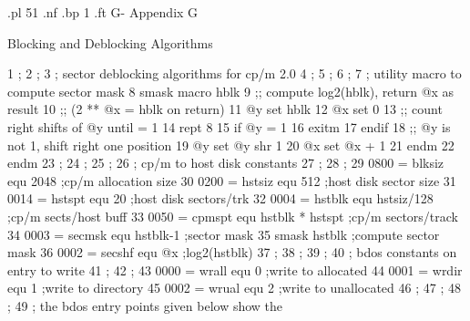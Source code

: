 .pl 51
.nf
.bp 1
.ft                                                       G-%
                                     Appendix G

                         Blocking and Deblocking Algorithms



  1                ;
  2                ;
  3                ;         sector deblocking algorithms for cp/m 2.0
  4                ;
  5                ;
  6                ;
  7                ;         utility macro to compute sector mask
  8                smask     macro    hblk
  9                ;;        compute log2(hblk), return @x as result
 10                ;;        (2 ** @x = hblk on return)
 11                @y        set      hblk
 12                @x        set      0
 13                ;;        count right shifts of @y until = 1
 14                          rept     8
 15                          if       @y = 1
 16                          exitm
 17                          endif
 18                ;;        @y is not 1, shift right one position
 19                @y        set      @y shr 1
 20                @x        set      @x + 1
 21                          endm
 22                          endm
 23                ;
 24                ;
 25                ;
 26                ;         cp/m to host disk constants
 27                ;
 28                ;
 29    0800 =      blksiz    equ      2048                   ;cp/m allocation size
 30    0200 =      hstsiz    equ      512                    ;host disk sector size
 31    0014 =      hstspt    equ      20                     ;host disk sectors/trk
 32    0004 =      hstblk    equ      hstsiz/128             ;cp/m sects/host buff
 33    0050 =      cpmspt    equ      hstblk * hstspt        ;cp/m sectors/track
 34    0003 =      secmsk    equ      hstblk-1               ;sector mask
 35                          smask    hstblk                 ;compute sector mask
 36    0002 =      secshf    equ      @x                     ;log2(hstblk)
 37                ;
 38                ;
 39                ;
 40                ;         bdos constants on entry to write
 41                ;
 42                ;
 43    0000 =      wrall     equ      0                      ;write to allocated
 44    0001 =      wrdir     equ      1                      ;write to directory
 45    0002 =      wrual     equ      2                      ;write to unallocated
 46                ;
 47                ;
 48                ;
 49                ;         the bdos entry points given below show the
